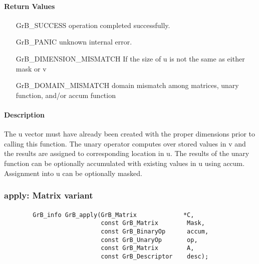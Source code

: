 \paragraph{Return Values}

\begin{itemize}[leftmargin=2.1in]
\item[{\sf GrB\_SUCCESS}]     operation completed successfully.
\item[{\sf GrB\_PANIC}]        unknown internal error.
\item[{\sf GrB\_DIMENSION\_MISMATCH}]            
        If the size of {\sf u} is not the same as either {\sf mask} or {\sf v}
\item[{\sf GrB\_DOMAIN\_MISMATCH}]  
        domain mismatch among matrices, unary function, and/or
        accum function 
\end{itemize}

\paragraph{Description}

The {\sf u} vector must have already been created with the proper dimensions
prior to calling this function.  The unary operator computes over stored values in {\sf v} and the results are assigned to corresponding location in {\sf u}.
The results of the unary function can be optionally accumulated with existing values in {\sf u} using {\sf accum}.  Assignment into {\sf u} can be optionally masked.


\subsubsection{{\sf apply}: Matrix variant}

\paragraph{\syntax}

\begin{verbatim}
        GrB_info GrB_apply(GrB_Matrix             *C,
                           const GrB_Matrix        Mask,
                           const GrB_BinaryOp      accum,
                           const GrB_UnaryOp       op,
                           const GrB_Matrix        A,
                           const GrB_Descriptor    desc);
\end{verbatim}

